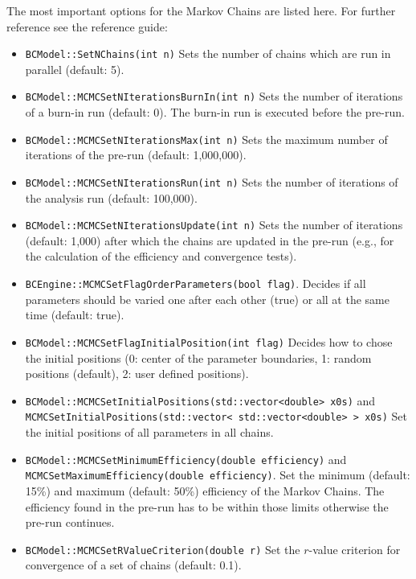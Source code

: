 \documentclass[11pt, a4paper]{article}
\begin{document}
The most important options for the Markov Chains are listed here. For
further reference see the reference guide: 
%
\begin{itemize}
\item \verb|BCModel::SetNChains(int n)| Sets the number of chains
  which are run in parallel (default: 5).
\item \verb|BCModel::MCMCSetNIterationsBurnIn(int n)| Sets the number
  of iterations of a burn-in run (default: 0). The burn-in run is
  executed before the pre-run.
\item \verb|BCModel::MCMCSetNIterationsMax(int n)| Sets the maximum
  number of iterations of the pre-run (default: 1,000,000).  
\item \verb|BCModel::MCMCSetNIterationsRun(int n)| Sets the number of
  iterations of the analysis run (default: 100,000). 
\item \verb|BCModel::MCMCSetNIterationsUpdate(int n)| Sets the number
  of iterations (default: 1,000) after which the chains are updated in
  the pre-run (e.g., for the calculation of the efficiency and
  convergence tests).
\item \verb|BCEngine::MCMCSetFlagOrderParameters(bool flag)|. Decides
  if all parameters should be varied one after each other (true) or
  all at the same time (default: true). 
\item \verb|BCModel::MCMCSetFlagInitialPosition(int flag)| Decides how
  to chose the initial positions (0: center of the parameter
  boundaries, 1: random positions (default), 2: user defined
  positions).
\item \verb|BCModel::MCMCSetInitialPositions(std::vector<double> x0s)|
  and
  \verb|MCMCSetInitialPositions(std::vector< std::vector<double> > x0s)|
  Set the initial positions of all parameters in all chains.
\item \verb|BCModel::MCMCSetMinimumEfficiency(double efficiency)| and
  \verb|MCMCSetMaximumEfficiency(double efficiency)|. Set the minimum
  (default: 15\%) and maximum (default: 50\%) efficiency of the Markov
  Chains. The efficiency found in the pre-run has to be within those
  limits otherwise the pre-run continues.
\item \verb|BCModel::MCMCSetRValueCriterion(double r)| Set the
  $r$-value criterion for convergence of a set of chains (default:
  0.1).
\end{itemize}

\end{document}
